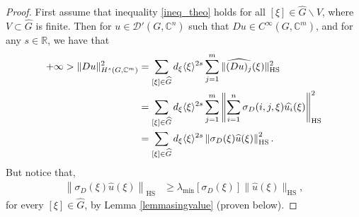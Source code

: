 \documentclass[10pt,a4paper]{amsart}
\newcommand{\C}{\mathbb{C}}
\newcommand{\HS}{\operatorname{HS}}
\begin{document}
\begin{proof}
    First assume that inequality \eqref{ineq_theo} holds for all $[\xi]\in\widehat{G}\backslash V$, where $V\subset\widehat{G}$ is finite. Then for $u\in \mathcal{D}'(G,\C^n)$ such that $Du\in C^\infty(G,\C^m)$, and for any $s\in\mathbb{R}$, we have that
    \begin{align}\label{ineqprooftheovector1}
        +\infty>\|Du\|^2_{H^s(G,\C^m)} &= \sum_{[\xi]\in\widehat{G}}d_\xi\langle\xi\rangle^{2s} \sum_{j=1}^{m}\|\widehat{(Du)_j}(\xi)\|_{\HS}^2\notag\\
        &=\sum_{[\xi]\in\widehat{G}}d_\xi\langle\xi\rangle^{2s}\sum_{j=1}^{m}\left\|\sum_{i=1}^{n }\sigma_D(i,j,\xi)\widehat{u_i}(\xi)\right\|_{\HS}^2\notag \\
        &=\sum_{[\xi]\in\widehat{G}}d_\xi\langle\xi\rangle^{2s}\left\|\sigma_D(\xi)\widehat{u}(\xi)\right\|_{\HS}^2.
    \end{align}
        But notice that, 
        \begin{align*}
          \left\|\sigma_D(\xi)\widehat{u}(\xi)\right\|_{\HS}
           &\geq 
           \lambda_{\min}[\sigma_D(\xi)]\|\widehat{u}(\xi)\|_{\HS},
        \end{align*}
        for every $[\xi]\in\widehat{G}$, by Lemma \ref{lemmasingvalue} (proven below).

\end{proof}
\end{document}

